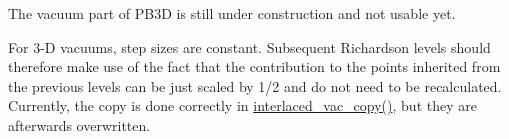 
\begin{DoxyRefList}
\item[\label{todo__todo000001}%
\Hypertarget{todo__todo000001}%
Module \hyperlink{namespacevac__ops}{vac\+\_\+ops} ]The vacuum part of P\+B3D is still under construction and not usable yet.  
\item[\label{todo__todo000002}%
\Hypertarget{todo__todo000002}%
Subprogram \hyperlink{namespacevac__ops_a7e3f92fbe9fa6cf3de6ac301676b96d1}{vac\+\_\+ops\+:\+:calc\+\_\+gh} (vac, n\+\_\+r\+\_\+in, lims\+\_\+r\+\_\+in, x\+\_\+vec\+\_\+in, G\+\_\+in, H\+\_\+in)]For 3-\/D vacuums, step sizes are constant. Subsequent Richardson levels should therefore make use of the fact that the contribution to the points inherited from the previous levels can be just scaled by 1/2 and do not need to be recalculated. Currently, the copy is done correctly in \hyperlink{namespacevac__utilities_a8e7889688701f6ac2fd2c60cdee2b96a}{interlaced\+\_\+vac\+\_\+copy()}, but they are afterwards overwritten.
\end{DoxyRefList}